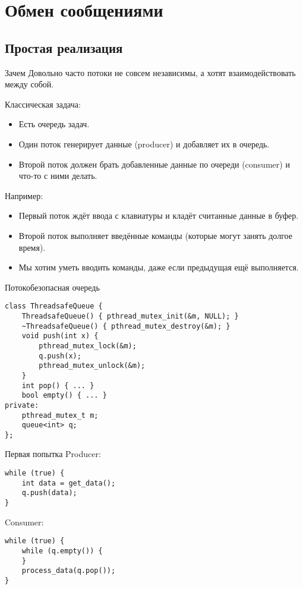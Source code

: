 \section{Обмен сообщениями}
\subsection{Простая реализация}

\begin{frame}
\end{frame}

\begin{frame}{Зачем}
	Довольно часто потоки не совсем независимы, а хотят взаимодействовать между собой.

	Классическая задача:
	\begin{itemize}
		\item Есть очередь задач.
		\item Один поток генерирует данные (producer) и добавляет их в очередь.
		\item Второй поток должен брать добавленные данные по очереди (consumer) и что-то с ними делать.
	\end{itemize}
	Например:
	\begin{itemize}
		\item Первый поток ждёт ввода с клавиатуры и кладёт считанные данные в буфер.
		\item Второй поток выполняет введённые команды (которые могут занять долгое время).
		\item Мы хотим уметь вводить команды, даже если предыдущая ещё выполняется.
	\end{itemize}
\end{frame}

\begin{frame}[fragile]{Потокобезопасная очередь}
\begin{verbatim}
class ThreadsafeQueue {
    ThreadsafeQueue() { pthread_mutex_init(&m, NULL); }
    ~ThreadsafeQueue() { pthread_mutex_destroy(&m); }
    void push(int x) {
        pthread_mutex_lock(&m);
        q.push(x);
        pthread_mutex_unlock(&m);
    }
    int pop() { ... }
    bool empty() { ... }
private:
    pthread_mutex_t m;
    queue<int> q;
};
\end{verbatim}
\end{frame}

\begin{frame}[fragile]{Первая попытка}
	Producer:
\begin{verbatim}
while (true) {
    int data = get_data();
    q.push(data);
}
\end{verbatim}
	Consumer:
	\pause
\begin{verbatim}
while (true) {
    while (q.empty()) {
    }
    process_data(q.pop());
}
\end{verbatim}
\end{frame}

